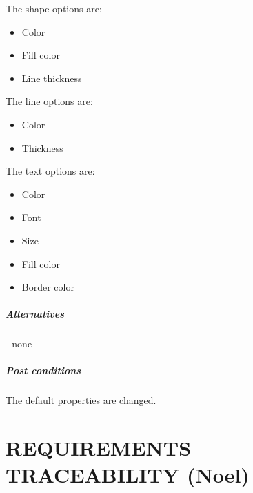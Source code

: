 \documentclass[twoside,letterpaper]{article}
\begin{document}
{The shape options are:
\begin{itemize}
\item Color
\item Fill color
\item Line thickness
\end{itemize}

\indent The line options are:
\begin{itemize}
\item Color
\item Thickness
\end{itemize}


\indent The text options are:
\begin{itemize}

\item Color
\item Font
\item Size
\item Fill color
\item Border color
\end{itemize}


\subparagraph*{Alternatives}- none -
\subparagraph*{Post conditions\\}The default properties are changed.




\clearpage\setcounter{page}{1}\pagestyle{Convertvi}
\section[REQUIREMENTS
TRACEABILITY (Noel and Max)]{\rmfamily\bfseries\color{black}
REQUIREMENTS TRACEABILITY (Noel)}

}
\end{document}

